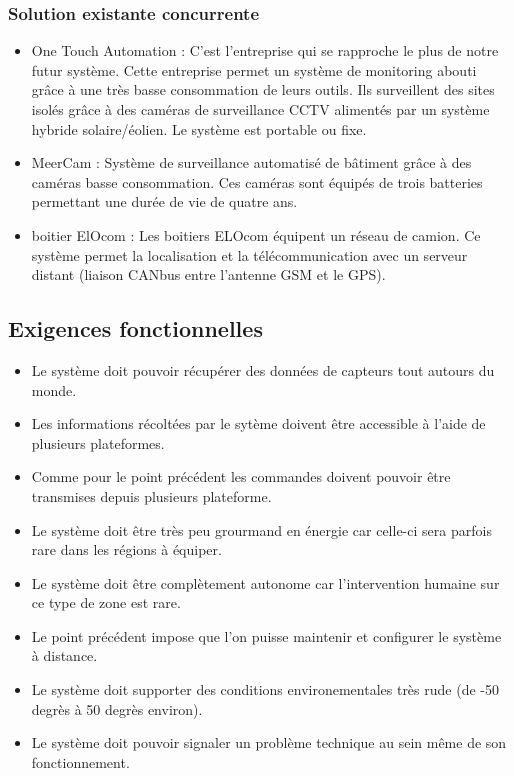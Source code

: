 	\subsubsection{Solution existante concurrente}
\begin{itemize}
\item One Touch Automation :
C’est l’entreprise qui se rapproche le plus de notre futur système. Cette entreprise permet un système de monitoring abouti grâce à une très basse consommation de leurs outils. Ils surveillent des sites isolés grâce à des caméras de surveillance CCTV alimentés par un système hybride solaire/éolien. Le système est portable ou fixe.
\item MeerCam :
Système de surveillance automatisé de bâtiment grâce à des caméras basse consommation. Ces caméras sont équipés de trois batteries permettant une durée de vie de quatre ans.
\item boitier ElOcom :
Les boitiers ELOcom équipent un réseau de camion. Ce système permet la localisation et la télécommunication avec un serveur distant (liaison CANbus entre l’antenne GSM et le GPS).
\end{itemize}

    \subsection{Exigences fonctionnelles}
\begin{itemize}
\item Le système doit pouvoir récupérer des données de capteurs tout autours du monde.
\item Les informations récoltées par le sytème doivent être accessible à l'aide de plusieurs plateformes.
\item Comme pour le point précédent les commandes doivent pouvoir être transmises depuis plusieurs plateforme.
\item Le système doit être très peu grourmand en énergie car celle-ci sera parfois rare dans les régions à équiper.
\item Le système doit être complètement autonome car l'intervention humaine sur ce type de zone est rare.
\item Le point précédent impose que l'on puisse maintenir et configurer le système à distance.
\item Le système doit supporter des conditions environementales très rude (de -50 degrès à 50 degrès environ).
\item Le système doit pouvoir signaler un problème technique au sein même de son fonctionnement.
\end{itemize}

